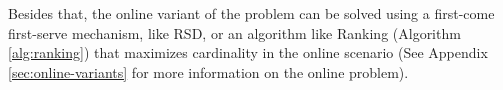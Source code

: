 Besides that, the online variant of the problem can be solved using a first-come first-serve mechanism, like RSD, or an algorithm like Ranking (Algorithm \ref{alg:ranking}) that maximizes cardinality in the online scenario (See Appendix \ref{sec:online-variants} for more information on the online problem).